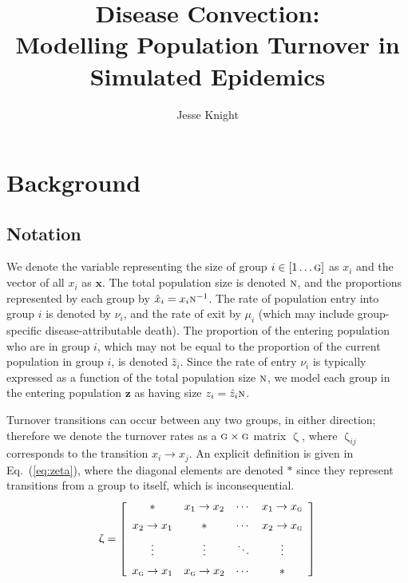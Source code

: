 \documentclass{article}
\title{Disease Convection:\\
  Modelling Population Turnover in Simulated Epidemics}
\author{Jesse Knight}
\numberwithin{equation}{section}
\renewcommand{\zeta}{\upzeta}
\newcommand{\x}{\hat{x}}
\newcommand{\z}{\hat{z}}
\newcommand{\N}{\textsc{n}}
\newcommand{\G}{\textsc{g}}
\begin{document}
\maketitle
\tableofcontents
\clearpage
\section{Background}

\subsection{Notation}
We denote the variable representing
the size of group $i \in [1 \dots \G]$ as $x_i$
and the vector of all $x_i$ as $\bm{x}$.
The total population size is denoted $\N$,
and the proportions represented by each group by $\x_i = x_i \N^{-1}$.
The rate of population entry into group $i$ is denoted by $\nu_i$, and
the rate of exit by $\mu_i$
(which may include group-specific disease-attributable death).
The proportion of the entering population who are in group $i$,
which may not be equal to the proportion of the current population in group $i$,
is denoted $\z_i$.
Since the rate of entry $\nu_i$ is typically expressed as
a function of the total population size $\N$,
we model each group in the entering population $\bm{z}$
as having size $z_i = \z_i \N$.
\par
Turnover transitions can occur between any two groups, in either direction;
therefore we denote the turnover rates as a $\G \times \G$ matrix $\zeta$,
where $\zeta_{ij}$ corresponds to the transition $x_i \rightarrow x_j$.
An explicit definition is given in Eq.~(\ref{eq:zeta}),
where the diagonal elements are denoted $*$ since they represent
transitions from a group to itself, which is inconsequential.
\begin{equation}\label{eq:zeta}
\zeta = \left[\begin{array}{cccc}
         *           & x_1  \rightarrow x_2 & \cdots & x_1 \rightarrow x_\G \\[0.5em]
x_2  \rightarrow x_1 &          *           & \cdots & x_2 \rightarrow x_\G \\[0.5em]
      \vdots         &       \vdots         & \ddots &       \vdots         \\[0.5em]
x_\G \rightarrow x_1 & x_\G \rightarrow x_2 & \cdots &          *
\end{array}\right]
\end{equation}
\end{document}
